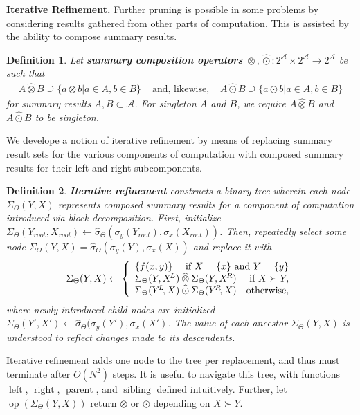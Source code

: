 \documentclass{article}
\newtheorem{definition} {Definition}
\newcommand{\GNP}[1][\psi]{{#1}_{\Theta}}
\newcommand{\sigmahat}{\mathbin{\widehat{\sigma}}}
\newcommand{\otimeshat}{\mathbin{\widehat{\otimes}}}
\newcommand{\odothat}{\mathbin{\widehat{\odot}}}
\DeclareMathOperator{\leftchild}{left}
\DeclareMathOperator{\rightchild}{right}
\DeclareMathOperator{\parent}{parent}
\DeclareMathOperator{\sibling}{sibling}
\DeclareMathOperator{\op}{op}
\begin{document}
{\bf Iterative Refinement.}  Further pruning is possible in some
problems by considering results gathered from other parts of
computation.  This is assisted by the ability to compose summary
results.
\begin{definition}
  Let {\bf summary composition operators} $\otimeshat, \odothat \colon
  2^{\mathcal{A}} \times 2^{\mathcal{A}} \to 2^{\mathcal{A}}$ be such
  that
  \[ \begin{array}{rcl}
    A \otimeshat B \supseteq \{a \otimes b | a \in A, b \in B\} & \mbox{ and, likewise, } & A \odothat B \supseteq \{a \odot b | a \in A, b \in B\}
  \end{array} \]
  for summary results $A,B \subset \mathcal{A}$.  For singleton $A$
  and $B$, we require $A \otimeshat B$ and $A \odothat B$ to be
  singleton.
\end{definition}
\noindent We develope a notion of iterative refinement by means of
replacing summary result sets for the various components of
computation with composed summary results for their left and right
subcomponents.
\begin{definition}
  {\bf Iterative refinement} constructs a binary tree wherein each
  node $\GNP[\Sigma](Y,X)$ represents composed summary results for a
  component of computation introduced via block decomposition.  First,
  initialize $\GNP[\Sigma](Y_{root},X_{root}) \gets
  \GNP[\sigmahat](\sigma_y(Y_{root}),\sigma_x(X_{root}))$.  Then,
  repeatedly select some node $\GNP[\Sigma](Y,X) =
  \GNP[\sigmahat](\sigma_y(Y),\sigma_x(X))$ and replace it with
  \[
  \GNP[\Sigma](Y,X) \gets \left\{ \begin{array}{lrr}
    \{f(x,y)\} & \multicolumn{2}{r}{\mbox{\rm if } X = \{x\} \mbox{ \rm and } Y = \{y\}} \\
    \multicolumn{2}{l}{\GNP[\Sigma](Y,X^{\!L}) \otimeshat \GNP[\Sigma](Y,X^{\!R})} & \mbox{\rm if } X \succ Y, \\
    \multicolumn{2}{l}{\GNP[\Sigma](Y^{\!L}\!,X) \odothat \GNP[\Sigma](Y^{\!R}\!,X)} & \mbox{\rm otherwise},
  \end{array} \right.
  \]
  where newly introduced child nodes are initialized
  $\GNP[\Sigma](Y',X') \gets \GNP[\sigmahat](\sigma_y(Y'),\sigma_x(X')$.
  The value of each ancestor $\GNP[\Sigma](Y,X)$ is understood to
  reflect changes made to its descendents.
\end{definition}
\noindent Iterative refinement adds one node to the tree per
replacement, and thus must terminate after $O(N^2)$ steps.  It is
useful to navigate this tree, with functions $\leftchild$,
$\rightchild$, $\parent$, and $\sibling$ defined intuitively.
Further, let $\op(\GNP[\Sigma](Y,X))$ return $\otimes$ or $\odot$
depending on $X \succ Y$.
\end{document}
